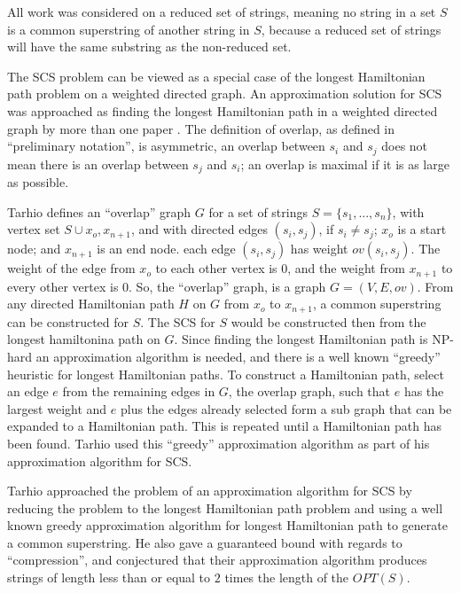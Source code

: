 \documentclass[letterpaper,11pt,titlepage]{article}
\begin{document}
All work was considered on a reduced set of strings, meaning no string in a set $S$ is a common superstring of another string in $S$, because a reduced set of strings will have the same substring as the non-reduced set.

The SCS problem can be viewed as a special case of the longest Hamiltonian path problem on a weighted directed graph. An approximation solution for SCS was approached as finding the longest Hamiltonian path in a weighted directed graph by more than one paper \cite{tarhio1988greedy} \cite{turner1989approximation}. The definition of overlap, as defined in ``preliminary notation'',  is asymmetric, an overlap between $s_i$ and $s_j$ does not mean there is an overlap between $s_j$ and $s_i$;  an overlap is maximal if it is as large as possible. 

Tarhio defines an ``overlap'' graph $G$ for a set of strings $S = \{s_1, ... ,s_n\}$, with vertex set $S \cup {x_o, x_{n+1}}$, and with directed edges $(s_i, s_j)$, if $s_i \neq s_j$;  $x_o$ is a start node; and $x_{n+1}$ is an end node.  each edge $(s_i, s_j)$ has weight $ov(s_i, s_j)$.  The weight of the edge from $x_o$ to each other vertex is $0$, and the weight from $x_{n+1}$ to every other vertex is $0$.  So, the ``overlap'' graph, is a graph $G = (V, E, ov)$.  From any directed Hamiltonian path $H$ on $G$ from $x_o$ to $x_{n+1}$, a common superstring can be constructed for $S$.  The SCS for $S$ would be constructed then from the longest hamiltonina path on $G$. Since finding the longest Hamiltonian path is NP-hard an approximation algorithm is needed, and there is a well known ``greedy'' heuristic for longest Hamiltonian paths.  To construct a Hamiltonian path, select an edge $e$ from the remaining edges in $G$, the overlap graph, such that $e$ has the largest weight and $e$ plus the edges already selected form a sub graph that can be expanded to a Hamiltonian path.  This is repeated until a Hamiltonian path has been found.  Tarhio used this ``greedy'' approximation algorithm as part of his approximation algorithm for SCS.

Tarhio approached the problem of an approximation algorithm for SCS by reducing the problem to the longest Hamiltonian path problem and using a well known greedy approximation algorithm for longest Hamiltonian path to generate a common superstring. He also gave a guaranteed bound with regards to ``compression'',  and conjectured  that their approximation algorithm produces strings of length less than or equal to $2$ times the length of the $OPT(S)$.  
\end{document}
